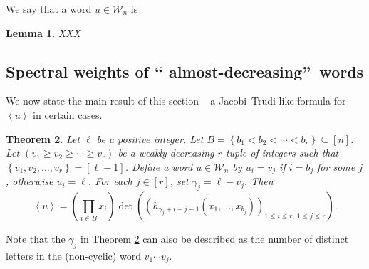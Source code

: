 \documentclass[reqno]{amsart}%
\newcommand{\0}{\phantom{c}}
\let\prodnonlimits\prod
\renewcommand{\prod}{\prodnonlimits\limits}
\theoremstyle{plain}
\newtheorem{thm}{Theorem}[section]
\newtheorem{lemma}[thm]{Lemma}
\theoremstyle{definition}
\numberwithin{equation}{section}
\begin{document}
We say that a word $u\in\mathcal{W}_{n}$ is

\begin{lemma}
\label{lem:determinant_form.1}XXX
\end{lemma}

\subsection{Spectral weights of \textquotedblleft
almost-decreasing\textquotedblright\ words}

We now state the main result of this section -- a Jacobi--Trudi-like formula
for $\left\langle u\right\rangle $ in certain cases.

\begin{thm}
\label{thm:determinant_form} Let $\ell$ be a positive integer. Let $B=\left\{
b_{1}<b_{2}<\cdots<b_{r}\right\}  \subseteq\left[  n\right]  $. Let $\left(
v_{1}\geq v_{2}\geq\dotsm\geq v_{r}\right)  $ be a weakly decreasing $r$-tuple
of integers such that $\left\{  v_{1},v_{2},\ldots,v_{r}\right\}  =\left[
\ell-1\right]  $. Define a word $u\in\mathcal{W}_{n}$ by $u_{i}=v_{j}$ if
$i=b_{j}$ for some $j$, otherwise $u_{i}=\ell$. For each $j\in\left[
r\right]  $, set $\gamma_{j}=\ell-v_{j}$. Then
\[
\left\langle u\right\rangle =\left(  \prod_{i\in B}x_{i}\right)  \det\left(
\left(  h_{\gamma_{j}+i-j-1}(x_{1},\dotsc,x_{b_{j}})\right)  _{1\leq i\leq
r,\ 1\leq j\leq r}\right)  .
\]

\end{thm}

Note that the $\gamma_{j}$ in Theorem \ref{thm:determinant_form} can also be
described as the number of distinct letters in the (non-cyclic) word
$v_{1}\dotsm v_{j}$.
\end{document}

